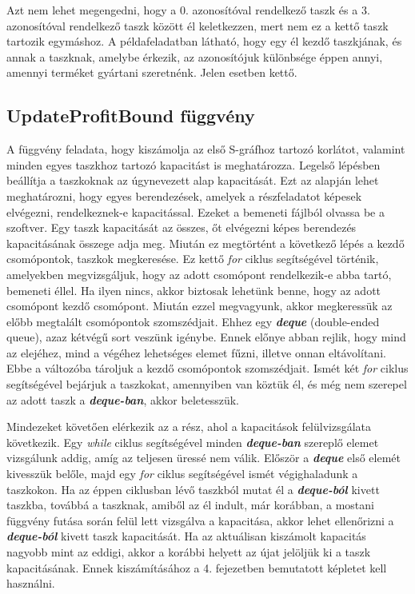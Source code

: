 Azt nem lehet megengedni, hogy a 0. azonosítóval rendelkező taszk és a 3. azonosítóval rendelkező taszk között él keletkezzen, mert nem ez a kettő taszk tartozik egymáshoz.
A példafeladatban látható, hogy egy él kezdő taszkjának, és annak a taszknak, amelybe érkezik, az azonosítójuk különbsége éppen annyi, amennyi terméket gyártani szeretnénk.
Jelen esetben kettő. 

\subsection{UpdateProfitBound függvény}
A függvény feladata, hogy kiszámolja az első S-gráfhoz tartozó korlátot, valamint minden egyes taszkhoz tartozó kapacitást is meghatározza.
Legelső lépésben beállítja a taszkoknak az úgynevezett alap kapacitását.
Ezt az alapján lehet meghatározni, hogy egyes berendezések, amelyek a részfeladatot képesek elvégezni, rendelkeznek-e kapacitással.
Ezeket a bemeneti fájlból olvassa be a szoftver.
Egy taszk kapacitását az összes, őt elvégezni képes berendezés kapacitásának összege adja meg.
Miután ez megtörtént a következő lépés a kezdő csomópontok, taszkok megkeresése.
Ez kettő \textit{for} ciklus segítségével történik, amelyekben megvizsgáljuk, hogy az adott csomópont rendelkezik-e abba tartó, bemeneti éllel.
Ha ilyen nincs, akkor biztosak lehetünk benne, hogy az adott csomópont kezdő csomópont.
Miután ezzel megvagyunk, akkor megkeressük az előbb megtalált csomópontok szomszédjait.
Ehhez egy \textbf{\textit{deque}} (double-ended queue), azaz kétvégű sort veszünk igénybe.
Ennek előnye abban rejlik, hogy mind az elejéhez, mind a végéhez lehetséges elemet fűzni, illetve onnan eltávolítani.
Ebbe a változóba tároljuk a kezdő csomópontok szomszédjait.
Ismét két \textit{for} ciklus segítségével bejárjuk a taszkokat, amennyiben van köztük él, és még nem szerepel az adott taszk a \textbf{\textit{deque-ban}}, akkor beletesszük.

Mindezeket követően elérkezik az a rész, ahol a kapacitások felülvizsgálata következik.
Egy \textit{while} ciklus segítségével minden \textbf{\textit{deque-ban}} szereplő elemet vizsgálunk addig, amíg az teljesen üressé nem válik.
Először a \textbf{\textit{deque}} első elemét kivesszük belőle, majd egy \textit{for} ciklus segítségével ismét végighaladunk a taszkokon.
Ha az éppen ciklusban lévő taszkból mutat él a \textbf{\textit{deque-ból}} kivett taszkba, továbbá a taszknak, amiből az él indult, már korábban, a mostani függvény futása során felül lett vizsgálva a kapacitása, akkor lehet ellenőrizni a \textbf{\textit{deque-ból}} kivett taszk kapacitását.
Ha az aktuálisan kiszámolt kapacitás nagyobb mint az eddigi, akkor a korábbi helyett az újat jelöljük ki a taszk kapacitásának.
Ennek kiszámításához a 4. fejezetben bemutatott képletet kell használni.

